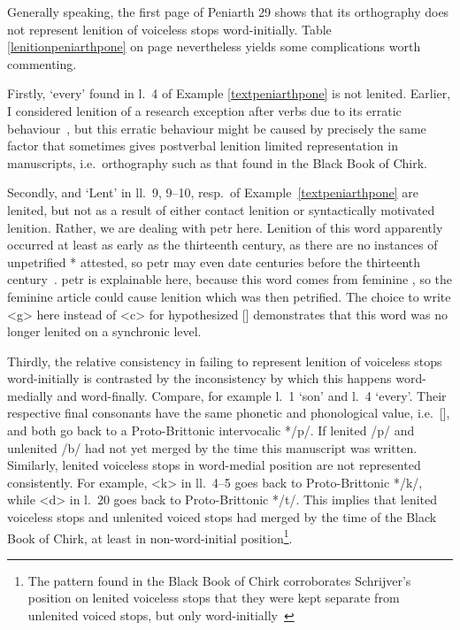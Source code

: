 Generally speaking, the first page of Peniarth 29 shows that its orthography does not represent lenition of voiceless stops word-initially. Table \ref{lenitionpeniarthpone} on page \pageref{lenitionpeniarthpone} nevertheless yields some complications worth commenting.

Firstly,  `every' found in l.~4 of Example \ref{textpeniarthpone} is not lenited. Earlier, I considered lenition of  a research exception after verbs due to its erratic behaviour~\parencite[24]{van_sluis_development_2014}, but this erratic behaviour might be caused by precisely the same factor that sometimes gives postverbal lenition limited representation in manuscripts, i.e.\ orthography such as that found in the Black Book of Chirk.

Secondly,  and  `Lent' in ll.~9, 9--10, resp.\ of Example~\ref{textpeniarthpone} are lenited, but not as a result of either contact lenition or syntactically motivated lenition. Rather, we are dealing with \gls{petr} here.
Lenition of this word apparently occurred at least as early as the thirteenth century, as there are no instances of unpetrified * attested, so \gls{petr} may even date centuries before the thirteenth century~\parencite[Grawys, Garawys]{bevan_geiriadur_2014}.
\Gls{petr} is explainable here, because this word comes from feminine , so the feminine article could cause lenition which was then petrified. The choice to write <g> here instead of <c> for hypothesized [\gd] demonstrates that this word was no longer lenited on a synchronic level. 

Thirdly, the relative consistency in failing to represent lenition of voiceless stops word-initially is contrasted by the inconsistency by which this happens word-medially and word-finally. Compare, for example l.~1  `son' and l.~4  `every'. Their respective final consonants have the same phonetic and phonological value, i.e.\ [\bd], and both go back to a Proto-Brittonic intervocalic */p/. If lenited /p/ and unlenited /b/ had not yet merged by the time this manuscript was written. Similarly, lenited voiceless stops in word-medial position are not represented consistently. For example, <k> in ll.~4–5  goes back to Proto-Brittonic */k/, while <d> in l.~20  goes back to Proto-Brittonic */t/. This implies that lenited voiceless stops and unlenited voiced stops had merged by the time of the Black Book of Chirk, at least in non-word-initial position\footnote{The pattern found in the Black Book of Chirk corroborates Schrijver's position on lenited voiceless stops that they were kept separate from unlenited voiced stops, but only word-initially~\autocite[31]{schrijver_old_2011}}.

